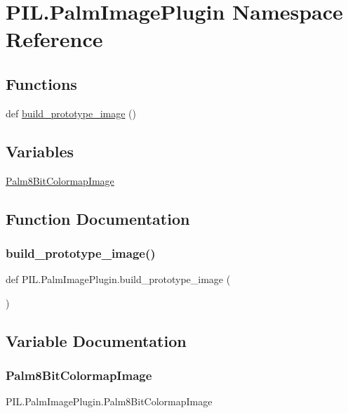 \hypertarget{namespacePIL_1_1PalmImagePlugin}{}\section{P\+I\+L.\+Palm\+Image\+Plugin Namespace Reference}
\label{namespacePIL_1_1PalmImagePlugin}
\subsection*{Functions}
\begin{DoxyCompactItemize}
\item 
def \hyperlink{namespacePIL_1_1PalmImagePlugin_abb77af2096960d49cda31aefab3397ad}{build\+\_\+prototype\+\_\+image} ()
\end{DoxyCompactItemize}
\subsection*{Variables}
\begin{DoxyCompactItemize}
\item 
\hyperlink{namespacePIL_1_1PalmImagePlugin_a7cc2757b7bdfd6bc3fc5fcf62c6037d9}{Palm8\+Bit\+Colormap\+Image}
\end{DoxyCompactItemize}


\subsection{Function Documentation}
\mbox{\label{namespacePIL_1_1PalmImagePlugin_abb77af2096960d49cda31aefab3397ad}} 
\subsubsection{\texorpdfstring{build\+\_\+prototype\+\_\+image()}{build\_prototype\_image()}}
{\footnotesize\ttfamily def P\+I\+L.\+Palm\+Image\+Plugin.\+build\+\_\+prototype\+\_\+image (\begin{DoxyParamCaption}{ }\end{DoxyParamCaption})}



\subsection{Variable Documentation}
\mbox{\label{namespacePIL_1_1PalmImagePlugin_a7cc2757b7bdfd6bc3fc5fcf62c6037d9}} 
\subsubsection{\texorpdfstring{Palm8\+Bit\+Colormap\+Image}{Palm8BitColormapImage}}
{\footnotesize\ttfamily P\+I\+L.\+Palm\+Image\+Plugin.\+Palm8\+Bit\+Colormap\+Image}


